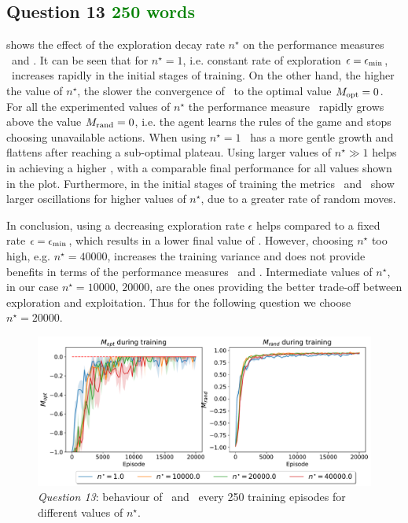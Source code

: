 \documentclass[10pt]{IEEEtran}
\begin{document}
\subsection*{Question 13  \textcolor{green}{250 words}}
 shows the effect of the exploration decay rate $n^{\star}$ on the performance measures \mopt\  and \mrand.
It can be seen that for $n^{\star} = 1$, i.e. constant rate of exploration $\epsilon = \epsilon_{\text{min}}$, \mopt\ increases rapidly in the initial stages of training. On the other hand, the higher the value of $n^{\star}$, the slower the convergence of \mopt\ to the optimal value $M_{\text{opt}} = 0$. 
For all the experimented values of $n^{\star}$ the performance measure \mrand\ rapidly grows above the value $M_{\text{rand}} = 0$, i.e. the agent learns the rules of the game and stops choosing unavailable actions. When using $n^{\star} = 1$ \mrand\ has a more gentle growth and flattens after reaching a sub-optimal plateau. Using larger values of $n^{\star} \gg 1$ helps in achieving a higher \mrand, with a comparable final performance for all values shown in the plot.
Furthermore, in the initial stages of training the metrics \mopt\ and \mrand\ show larger oscillations for higher values of $n^{\star}$, due to a greater rate of random moves.

In conclusion, using a decreasing exploration rate $\epsilon$ helps compared to a fixed rate $\epsilon = \epsilon_{\text{min}}$, which results in a lower final value of \mrand. However, choosing $n^{\star}$ too high, e.g. $n^{\star} = 40000$, increases the training variance and does not provide benefits in terms of the performance measures \mopt\ and \mrand. Intermediate values of $n^{\star}$, in our case $n^{\star}=10000,\,20000$, are the ones providing the better trade-off between exploration and exploitation. Thus for the following question we choose $n^{\star} = 20000$.

\begin{figure}[h]
    \centering
    \includegraphics[width = \linewidth]{code/figures/performance_dqn_n_star.pdf}
    \caption{\emph{Question 13}: behaviour of \mopt\  and \mrand\  every 250 training episodes for different values of $n^{\star}$.}
    \label{plot_question13}
\end{figure}
\end{document}
